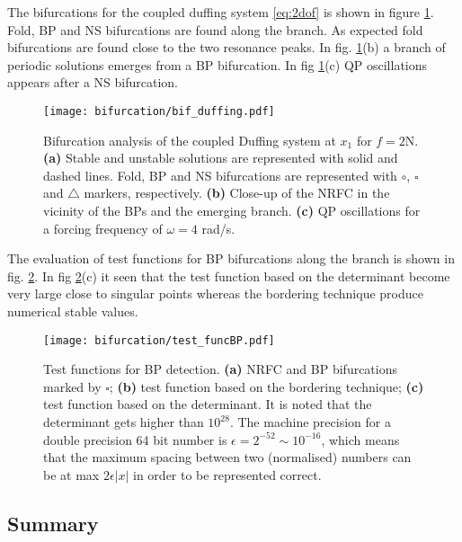 The bifurcations for the coupled duffing system \eqref{eq:2dof} is shown in
figure \ref{fig:bif_example}. Fold, BP and NS bifurcations are found along the
branch. As expected fold bifurcations are found close to the two resonance
peaks. In fig. \ref{fig:bif_example}(b) a branch of periodic solutions emerges
from a BP bifurcation. In fig \ref{fig:bif_example}(c) QP oscillations appears
after a NS bifurcation.

\begin{figure}[ht!]
  \centering
    \texttt{[image: bifurcation/bif\_duffing.pdf]}
  \caption{Bifurcation analysis of the coupled Duffing system at $x_1$ for
    $f=2$N.
    \textbf{(a)} Stable and unstable solutions are represented with solid and
    dashed lines. Fold, BP and NS bifurcations are represented with $\bm \circ$,
    $\bm \square$ and $\bm \triangle$ markers, respectively.
    \textbf{(b)} Close-up of the NRFC in the vicinity of the BPs and the
    emerging branch.
    \textbf{(c)} QP oscillations for a forcing frequency of $\omega=4$ rad/s.}
  \label{fig:bif_example}
\end{figure}

The evaluation of test functions for BP bifurcations along the branch is shown
in fig. \ref{fig:bif_BPtestfunction}. In fig \ref{fig:bif_BPtestfunction}(c) it
seen that the test function based on the determinant become very large close to
singular points whereas the bordering technique produce numerical stable values.

\begin{figure}[ht!]
  \centering
  \texttt{[image: bifurcation/test\_funcBP.pdf]}
  \caption{Test functions for BP detection.
    \textbf{(a)} NRFC and BP bifurcations marked by $\square$;
    \textbf{(b)} test function based on the bordering technique;
    \textbf{(c)} test function based on the determinant. It is noted that the
    determinant gets higher than $10^{28}$. The machine precision for a
    double precision 64 bit number is $\epsilon = 2^{-52} \sim 10^{-16}$,
    which means that the maximum spacing between two (normalised) numbers can be
    at max $2\epsilon |x|$ in order to be represented correct.}
  \label{fig:bif_BPtestfunction}
\end{figure}

\subsection{Summary}
\label{sec:bif_summary}

